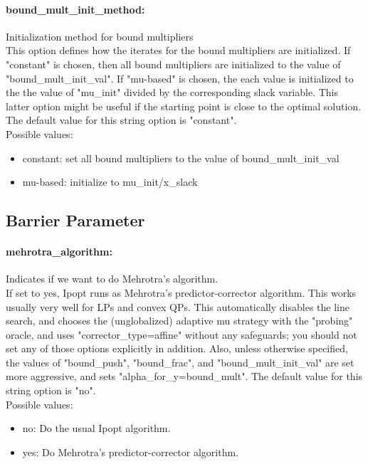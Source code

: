 \paragraph{bound\_mult\_init\_method:}\label{sec:bound_mult_init_method} Initialization method for bound multipliers $\;$ \\
 This option defines how the iterates for the
bound multipliers are initialized.  If "constant"
is chosen, then all bound multipliers are
initialized to the value of
"bound\_mult\_init\_val".  If "mu-based" is
chosen, the each value is initialized to the the
value of "mu\_init" divided by the corresponding
slack variable.  This latter option might be
useful if the starting point is close to the
optimal solution.
The default value for this string option is "constant".
\\ 
Possible values:
\begin{itemize}
   \item constant: set all bound multipliers to the value of
bound\_mult\_init\_val
   \item mu-based: initialize to mu\_init/x\_slack
\end{itemize}

\subsection{Barrier Parameter}

\paragraph{mehrotra\_algorithm:}\label{sec:mehrotra_algorithm} Indicates if we want to do Mehrotra's algorithm. $\;$ \\
 If set to yes, Ipopt runs as Mehrotra's
predictor-corrector algorithm. This works usually
very well for LPs and convex QPs.  This
automatically disables the line search, and
chooses the (unglobalized) adaptive mu strategy
with the "probing" oracle, and uses
"corrector\_type=affine" without any safeguards;
you should not set any of those options
explicitly in addition.  Also, unless otherwise
specified, the values of "bound\_push",
"bound\_frac", and "bound\_mult\_init\_val" are
set more aggressive, and sets
"alpha\_for\_y=bound\_mult".
The default value for this string option is "no".
\\ 
Possible values:
\begin{itemize}
   \item no: Do the usual Ipopt algorithm.
   \item yes: Do Mehrotra's predictor-corrector algorithm.
\end{itemize}

